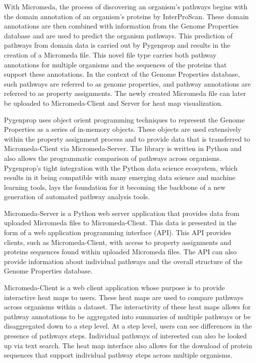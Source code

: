 With Micromeda, the process of discovering an organism's pathways begins with 
the domain annotation of an organism's proteins by InterProScan. These domain 
annotations are then combined with information from the Genome Properties 
database and are used to predict the organism pathways. This prediction of 
pathways from domain data is carried out by Pygenprop and results in the 
creation of a Micromeda file. This novel file type carries both pathway 
annotations for multiple organisms and the sequences of the proteins that 
support these annotations. In the context of the Genome Properties database, 
such pathways are referred to as genome properties, and pathway annotations are 
referred to as property assignments. The newly created Micromeda file can later 
be uploaded to Micromeda-Client and Server for heat map visualization.

Pygenprop uses object orient programming techniques to represent the Genome 
Properties as a series of in-memory objects. These objects are used extensively 
within the property assignment process and to provide data that is transferred 
to Micromeda-Client via Micromeda-Server. The library is written in Python and 
also allows the programmatic comparison of pathways across organisms. 
Pygenprop's tight integration with the Python data science ecosystem, which 
results in it being compatible with many emerging data science and machine 
learning tools, lays the foundation for it becoming the backbone of a new 
generation of automated pathway analysis tools.

Micromeda-Server is a Python web server application that provides data from 
uploaded Micromeda files to Micromeda-Client. This data is presented in the form 
of a web application programming interface (API). This API provides clients, 
such as Micromeda-Client, with access to property assignments and proteins 
sequences found within uploaded Micromeda files. The API can also provide 
information about individual pathways and the overall structure of the Genome 
Properties database.

Micromeda-Client is a web client application whose purpose is to provide 
interactive heat maps to users. These heat maps are used to compare pathways 
across organisms within a dataset. The interactivity of these heat maps allows 
for pathway annotations to be aggregated into summaries of multiple pathways or 
be disaggregated down to a step level. At a step level, users can see 
differences in the presence of pathways steps. Individual pathways of interested 
can also be looked up via text search. The heat map interface also allows for 
the download of protein sequences that support individual pathway steps across 
multiple organisms.


